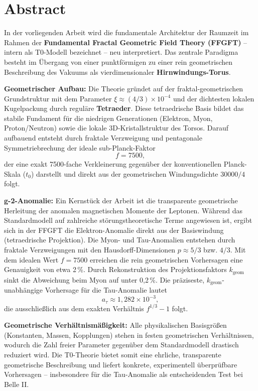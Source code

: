 \section*{Abstract}
		In der vorliegenden Arbeit wird die fundamentale Architektur der Raumzeit im Rahmen der \textbf{Fundamental Fractal Geometric Field Theory (FFGFT)} – intern als T0-Modell bezeichnet – neu interpretiert. Das zentrale Paradigma besteht im Übergang von einer punktförmigen zu einer rein geometrischen Beschreibung des Vakuums als vierdimensionaler \textbf{Hirnwindungs-Torus}.
		
		\textbf{Geometrischer Aufbau:} Die Theorie gründet auf der fraktal-geometrischen Grundstruktur mit dem Parameter $\xi \approx (4/3)\times 10^{-4}$ und der dichtesten lokalen Kugelpackung durch reguläre \textbf{Tetraeder}. Diese tetraedrische Basis bildet das stabile Fundament für die niedrigen Generationen (Elektron, Myon, Proton/Neutron) sowie die lokale 3D-Kristallstruktur des Torsos. Darauf aufbauend entsteht durch fraktale Verzweigung und pentagonale Symmetriebrechung der ideale sub-Planck-Faktor
		\begin{equation*}
			f = 7500,
		\end{equation*}
		der eine exakt 7500-fache Verkleinerung gegenüber der konventionellen Planck-Skala ($t_0$) darstellt und direkt aus der geometrischen Windungsdichte $30000/4$ folgt.
		
		\textbf{g-2-Anomalie:} Ein Kernstück der Arbeit ist die transparente geometrische Herleitung der anomalen magnetischen Momente der Leptonen. Während das Standardmodell auf zahlreiche störungstheoretische Terme angewiesen ist, ergibt sich in der FFGFT die Elektron-Anomalie direkt aus der Basiswindung (tetraedrische Projektion). Die Myon- und Tau-Anomalien entstehen durch fraktale Verzweigungen mit den Hausdorff-Dimensionen $p \approx 5/3$ bzw. $4/3$. Mit dem idealen Wert $f = 7500$ erreichen die rein geometrischen Vorhersagen eine Genauigkeit von etwa 2\,\%. Durch Rekonstruktion des Projektionsfaktors $k_\text{geom}$ sinkt die Abweichung beim Myon auf unter 0{,}2\,\%. Die präziseste, $k_\text{geom}$-unabhängige Vorhersage für die Tau-Anomalie lautet
		\begin{equation*}
			a_\tau \approx 1{,}282 \times 10^{-3},
		\end{equation*}
		die ausschließlich aus dem exakten Verhältnis $f^{1/3} - 1$ folgt.
		
		\textbf{Geometrische Verhältnismäßigkeit:} Alle physikalischen Basisgrößen (Konstanten, Massen, Kopplungen) stehen in festen geometrischen Verhältnissen, wodurch die Zahl freier Parameter gegenüber dem Standardmodell drastisch reduziert wird. Die T0-Theorie bietet somit eine ehrliche, transparente geometrische Beschreibung und liefert konkrete, experimentell überprüfbare Vorhersagen – insbesondere für die Tau-Anomalie als entscheidenden Test bei Belle II.

